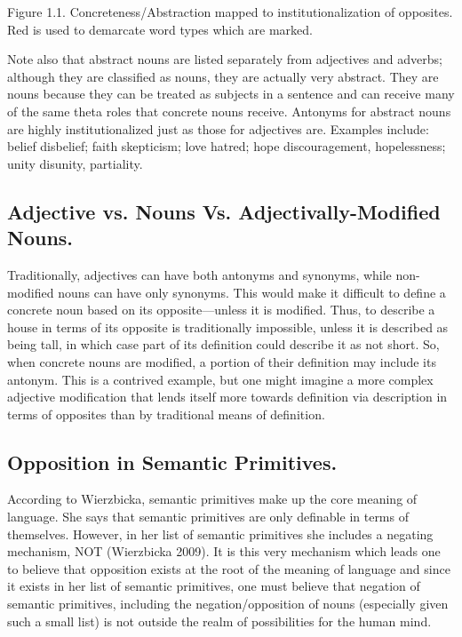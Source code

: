 Figure 1.1. Concreteness/Abstraction mapped to institutionalization of opposites.  Red is used to demarcate word types which are marked.

Note also that abstract nouns are listed separately from adjectives and adverbs; although they are classified as nouns, they are actually very abstract.  They are nouns because they can be treated as subjects in a sentence and can receive many of the same theta roles that concrete nouns receive.  
Antonyms for abstract nouns are highly institutionalized just as those for adjectives are.  Examples include: belief \opp disbelief; faith \opp skepticism; love \opp hatred; hope \opp discouragement, hopelessness; unity \opp disunity, partiality.

\subsection {Adjective vs. Nouns Vs. Adjectivally-Modified Nouns.}  Traditionally, adjectives can have both antonyms and synonyms, while non-modified nouns can have only synonyms.  This would make it difficult to define a concrete noun based on its opposite—unless it is modified.  Thus, to describe a house in terms of its opposite is traditionally impossible, unless it is described as being tall, in which case part of its definition could describe it as not short.  So, when concrete nouns are modified, a portion of their definition may include its antonym.  This is a contrived example, but one might imagine a more complex adjective modification that lends itself more towards definition via description in terms of opposites than by traditional means of definition.  

\subsection {Opposition in Semantic Primitives.} According to Wierzbicka, semantic primitives make up the core meaning of language.  She says that semantic primitives are only definable in terms of themselves.  However, in her list of semantic primitives she includes a negating mechanism, NOT (Wierzbicka 2009).  It is this very mechanism which leads one to believe that opposition exists at the root of the meaning of language and since it exists in her list of semantic primitives, one must believe that negation of semantic primitives, including the negation/opposition of nouns (especially given such a small list) is not outside the realm of possibilities for the human mind. 
